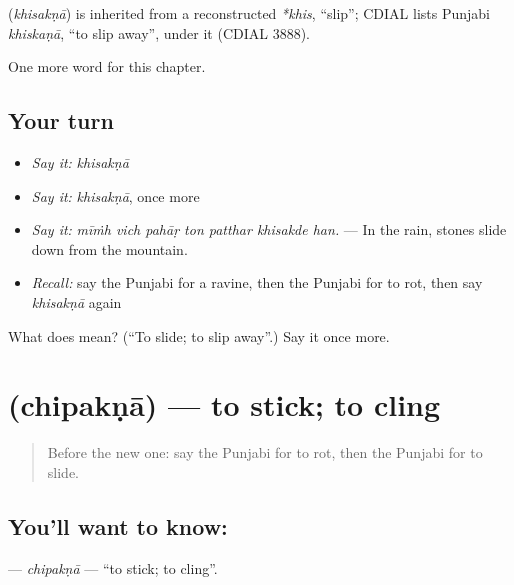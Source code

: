 \begin{cousinweb}
\textbf{} (\emph{khisakṇā}) is inherited from a reconstructed \emph{*khis}, \textquotedblleft{}slip\textquotedblright{}; CDIAL lists Punjabi \emph{khiskaṇā}, \textquotedblleft{}to slip away\textquotedblright{}, under it (CDIAL 3888).
\end{cousinweb}

\begin{grammarlens}[title={What you've built}]
One more word for this chapter.
\end{grammarlens}

\subsection*{Your turn}
\begin{itemize}
\raggedright
  \item \emph{Say it:} \emph{khisakṇā}
  \item \emph{Say it:} \emph{khisakṇā}, once more
  \item \emph{Say it:} \emph{mīṁh vich pahāṛ ton patthar khisakde han.} — In the rain, stones slide down from the mountain.
  \item \emph{Recall:} say the Punjabi for a ravine, then the Punjabi for to rot, then say \emph{khisakṇā} again
\end{itemize}

\begin{tcolorbox}[breakable,colback=teal!4,colframe=teal!35!black,title={Before you move on}]
What does  mean? (\textquotedblleft{}To slide; to slip away\textquotedblright{}.) Say it once more.
\end{tcolorbox}
\section[\texorpdfstring{\pa{ਚਿਪਕਣਾ} (chipakṇā)}{ਚਿਪਕਣਾ (chipakṇā)}]{ (chipakṇā) — to stick; to cling}

\label{lesson:PA-C296-chipakna}



\begin{quote}
Before the new one: say the Punjabi for to rot, then the Punjabi for to slide.
\end{quote}

\subsection*{You'll want to know: }
\textbf{} — \emph{chipakṇā} — \textquotedblleft{}to stick; to cling\textquotedblright{}.


